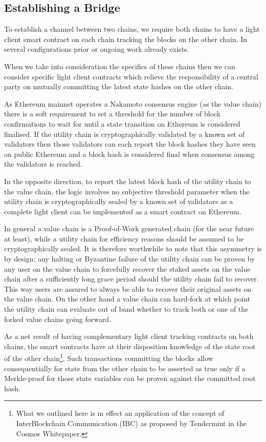 \documentclass[12pt,a4paper, twocolumn]{article}
\begin{document}
\subsection{Establishing a Bridge}
To establish a channel between two chains, we require both chains to have a light client smart contract on each chain tracking the blocks on the other chain.  In several configurations prior or ongoing work already exists. \par
When we take into consideration the specifics of these chains then we can consider specific light client contracts which relieve the responsibility of a central party on mutually committing the latest state hashes on the other chain. \par
As Ethereum mainnet operates a Nakamoto consensus engine (as the value chain) there is a soft requirement to set a threshold for the number of block confirmations to wait for until a state transition on Ethereum is considered finalised.  If the utility chain is cryptographically validated by a known set of validators then those validators can each report the block hashes they have seen on public Ethereum and a block hash is considered final when consensus among the validators is reached. \par
In the opposite direction, to report the latest block hash of the utility chain to the value chain, the logic involves no subjective threshold parameter when the utility chain is cryptographically sealed by a known set of validators as a complete light client can be implemented as a smart contract on Ethereum. \par
In general a value chain is a Proof-of-Work generated chain (for the near future at least), while a utility chain for efficiency  reasons should be assumed to be cryptographically sealed. It is therefore worthwhile to note that this asymmetry is by design: any halting or Byzantine failure of the utility chain can be proven by any user on the value chain to forcefully recover the staked assets on the value chain after a sufficiently long grace period should the utility chain fail to recover.  This way users are assured to always be able to recover their original assets on the value chain.  On the other hand a value chain can hard-fork at which point the utility chain can evaluate out of band whether to track both or one of the forked value chains going forward. \par
As a net result of having complementary light client tracking contracts on both chains, the smart contracts have at their disposition knowledge of the state root of the other chain\footnote{What we outlined here is in effect an application of the concept of InterBlockchain Communication (IBC) as proposed by Tendermint in the Cosmos Whitepaper.}.  Such transactions committing the blocks allow consequentially for state from the other chain to be asserted as true only if a Merkle-proof for those state variables can be proven against the committed root hash. \par
\end{document}
